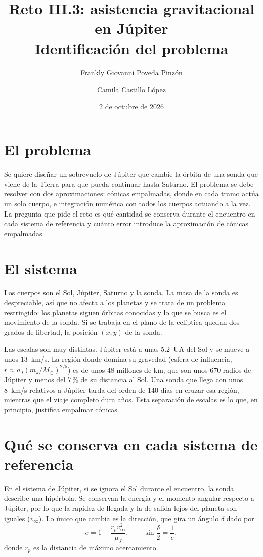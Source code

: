 \documentclass[12pt,letterpaper]{article}
\title{Reto III.3: asistencia gravitacional en Júpiter\\ Identificación del problema}
\author{Frankly Giovanni Poveda Pinzón \and Camila Castillo López}
\date{2 de octubre de 2026}
\begin{document}
\maketitle
\thispagestyle{empty}

\section{El problema}

Se quiere diseñar un sobrevuelo de Júpiter que cambie la órbita de una sonda que viene de
la Tierra para que pueda continuar hasta Saturno. El problema se debe resolver con dos
aproximaciones: cónicas empalmadas, donde en cada tramo actúa un solo cuerpo, e integración
numérica con todos los cuerpos actuando a la vez. La pregunta que pide el reto es qué
cantidad se conserva durante el encuentro en cada sistema de referencia y cuánto error
introduce la aproximación de cónicas empalmadas.

\section{El sistema}

Los cuerpos son el Sol, Júpiter, Saturno y la sonda. La masa de la sonda es despreciable,
así que no afecta a los planetas y se trata de un problema restringido: los planetas siguen
órbitas conocidas y lo que se busca es el movimiento de la sonda. Si se trabaja en el plano
de la eclíptica quedan dos grados de libertad, la posición $(x,y)$ de la sonda.

Las escalas son muy distintas. Júpiter está a unas 5.2~UA del Sol y se mueve a unos
13~km/s. La región donde domina su gravedad (esfera de influencia, $r \approx a_J
(m_J/M_\odot)^{2/5}$) es de unos 48 millones de km, que son unos 670 radios de Júpiter y
menos del 7\,\% de su distancia al Sol. Una sonda que llega con unos 8~km/s relativos a
Júpiter tarda del orden de 140 días en cruzar esa región, mientras que el viaje completo
dura años. Esta separación de escalas es lo que, en principio, justifica empalmar cónicas.

\section{Qué se conserva en cada sistema de referencia}

En el sistema de Júpiter, si se ignora el Sol durante el encuentro, la sonda describe una
hipérbola. Se conservan la energía y el momento angular respecto a Júpiter, por lo que la
rapidez de llegada y la de salida lejos del planeta son iguales ($v_\infty$). Lo único que
cambia es la dirección, que gira un ángulo $\delta$ dado por
\[
e = 1 + \frac{r_p v_\infty^2}{\mu_J}, \qquad \sin\frac{\delta}{2} = \frac{1}{e},
\]
donde $r_p$ es la distancia de máximo acercamiento.
\end{document}
